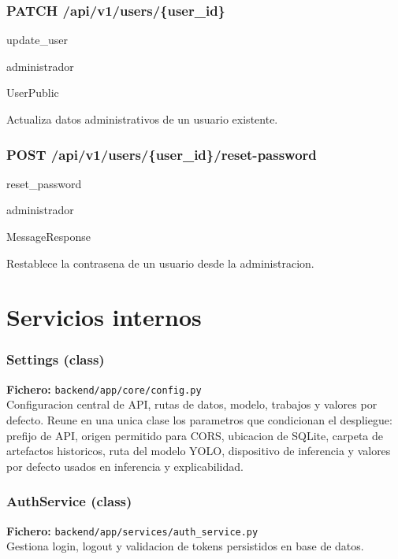 \subsubsection*{PATCH /api/v1/users/\{user\_id\}}
\begin{description}[leftmargin=2.8cm,style=nextline]
\item[Handler] update\_user
\item[Acceso] administrador
\item[Respuesta] UserPublic
\end{description}
Actualiza datos administrativos de un usuario existente.


\subsubsection*{POST /api/v1/users/\{user\_id\}/reset-password}
\begin{description}[leftmargin=2.8cm,style=nextline]
\item[Handler] reset\_password
\item[Acceso] administrador
\item[Respuesta] MessageResponse
\end{description}
Restablece la contrasena de un usuario desde la administracion.



\section{Servicios internos}
\subsubsection*{Settings (class)}
\noindent\textbf{Fichero:} \texttt{backend/app/core/config.py}\\
Configuracion central de API, rutas de datos, modelo, trabajos y valores por defecto. Reune en una unica clase los parametros que condicionan el despliegue: prefijo de API, origen permitido para CORS, ubicacion de SQLite, carpeta de artefactos historicos, ruta del modelo YOLO, dispositivo de inferencia y valores por defecto usados en inferencia y explicabilidad.


\subsubsection*{AuthService (class)}
\noindent\textbf{Fichero:} \texttt{backend/app/services/auth\_service.py}\\
Gestiona login, logout y validacion de tokens persistidos en base de datos.


